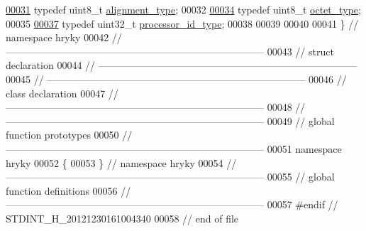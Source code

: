 \begin{DoxyCode}
\hypertarget{stdint_8h_source_l00031}{}\hyperlink{namespacehryky_aee1af251193c2d308aaa68ef7e36a540}{00031}     \textcolor{keyword}{typedef} uint8\_t                 \hyperlink{namespacehryky_aee1af251193c2d308aaa68ef7e36a540}{alignment_type};
00032 
\hypertarget{stdint_8h_source_l00034}{}\hyperlink{namespacehryky_a488cba8b666be33ccca70e819684e3c8}{00034}     \textcolor{keyword}{typedef} uint8\_t                 \hyperlink{namespacehryky_a488cba8b666be33ccca70e819684e3c8}{octet_type};
00035 
\hypertarget{stdint_8h_source_l00037}{}\hyperlink{namespacehryky_a5e2737162aa470ce3920f86e86eac0bc}{00037}     \textcolor{keyword}{typedef} uint32\_t                \hyperlink{namespacehryky_a5e2737162aa470ce3920f86e86eac0bc}{processor_id_type};
00038 
00039     
00040     
00041 \} \textcolor{comment}{// namespace hryky}
00042 \textcolor{comment}{//
      ------------------------------------------------------------------------------}
00043 \textcolor{comment}{// struct declaration}
00044 \textcolor{comment}{//
      ------------------------------------------------------------------------------}
00045 \textcolor{comment}{//
      ------------------------------------------------------------------------------}
00046 \textcolor{comment}{// class declaration}
00047 \textcolor{comment}{//
      ------------------------------------------------------------------------------}
00048 \textcolor{comment}{//
      ------------------------------------------------------------------------------}
00049 \textcolor{comment}{// global function prototypes}
00050 \textcolor{comment}{//
      ------------------------------------------------------------------------------}
00051 \textcolor{keyword}{namespace }hryky
00052 \{
00053 \} \textcolor{comment}{// namespace hryky}
00054 \textcolor{comment}{//
      ------------------------------------------------------------------------------}
00055 \textcolor{comment}{// global function definitions}
00056 \textcolor{comment}{//
      ------------------------------------------------------------------------------}
00057 \textcolor{preprocessor}{#endif // STDINT\_H\_20121230161004340}
00058 \textcolor{preprocessor}{}\textcolor{comment}{// end of file}
\end{DoxyCode}

